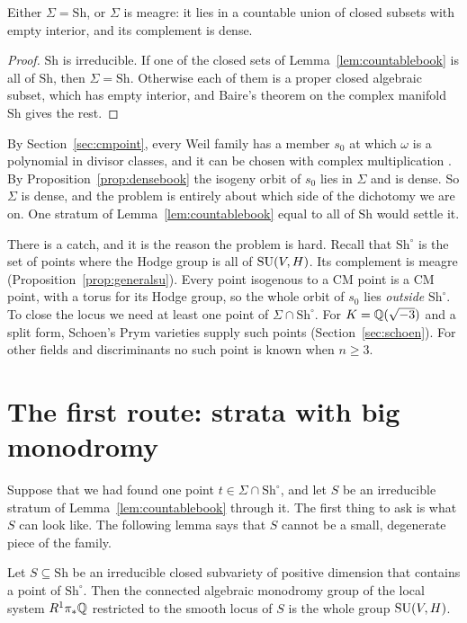 \begin{lemma}[Dichotomy]\label{lem:dichotomybook}
Either $\Sigma=\mathrm{Sh}$, or $\Sigma$ is meagre: it lies in a countable
union of closed subsets with empty interior, and its complement is dense.
\end{lemma}

\begin{proof}
$\mathrm{Sh}$ is irreducible. If one of the closed sets of
Lemma~\ref{lem:countablebook} is all of $\mathrm{Sh}$, then
$\Sigma=\mathrm{Sh}$. Otherwise each of them is a proper closed algebraic
subset, which has empty interior, and Baire's theorem on the complex
manifold $\mathrm{Sh}$ gives the rest.
\end{proof}

By Section~\ref{sec:cmpoint}, every Weil family has a member $s_{0}$ at
which $\omega$ is a polynomial in divisor classes, and it can be chosen
with complex multiplication \cite{BhH8}. By Proposition~\ref{prop:densebook}
the isogeny orbit of $s_{0}$ lies in $\Sigma$ and is dense. So $\Sigma$ is
dense, and the problem is entirely about which side of the dichotomy we are
on. One stratum of Lemma~\ref{lem:countablebook} equal to all of
$\mathrm{Sh}$ would settle it.

There is a catch, and it is the reason the problem is hard. Recall that
$\mathrm{Sh}^{\circ}$ is the set of points where the Hodge group is all of
$\operatorname{SU}(V,H)$. Its complement is meagre (Proposition~\ref{prop:generalsu}).
Every point isogenous to a CM point is a CM point, with a torus for its
Hodge group, so the whole orbit of $s_{0}$ lies \emph{outside}
$\mathrm{Sh}^{\circ}$. To close the locus we need at least one point of
$\Sigma\cap\mathrm{Sh}^{\circ}$. For $K=\mathbb{Q}(\sqrt{-3})$ and a split form,
Schoen's Prym varieties supply such points (Section~\ref{sec:schoen}). For
other fields and discriminants no such point is known when $n\ge3$.

\section{The first route: strata with big monodromy}

Suppose that we had found one point $t\in\Sigma\cap\mathrm{Sh}^{\circ}$, and let
$S$ be an irreducible stratum of Lemma~\ref{lem:countablebook} through it. The
first thing to ask is what $S$ can look like. The following lemma says that
$S$ cannot be a small, degenerate piece of the family.

\begin{theorem}\label{thm:monodromybook}
Let $S\subseteq\mathrm{Sh}$ be an irreducible closed subvariety of positive
dimension that contains a point of $\mathrm{Sh}^{\circ}$. Then the connected
algebraic monodromy group of the local system $R^{1}\pi_{*}\mathbb{Q}$ restricted
to the smooth locus of $S$ is the whole group $\operatorname{SU}(V,H)$.
\end{theorem}

